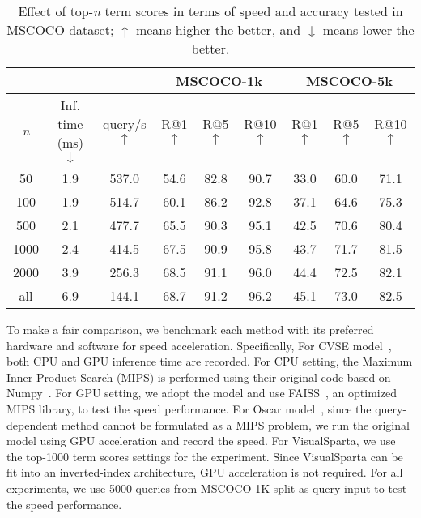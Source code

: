 \begin{table*}[ht!]
\centering
\small
\begin{tabular}{ccc@{\hskip 0.6cm}ccc@{\hskip 0.6cm}ccc}\hline
 & & & \multicolumn{3}{c}{MSCOCO-1k}&  \multicolumn{3}{c}{MSCOCO-5k} \\ \hline 

 \textit{n} & Inf. time (ms)$\downarrow$ & query/s$\uparrow$ & R@1$\uparrow$ & R@5$\uparrow$ & R@10$\uparrow$ & R@1$\uparrow$ & R@5$\uparrow$ & R@10$\uparrow$ \\ \hline  

50 & 1.9 & 537.0 & 54.6	& 82.8	& 90.7	& 33.0	& 60.0	& 71.1\\
100	& 1.9 & 514.7	& 60.1	& 86.2	& 92.8	& 37.1	& 64.6	& 75.3\\
500	& 2.1 & 477.7 & 65.5	& 90.3	& 95.1	& 42.5	& 70.6	& 80.4\\
1000 & 2.4 & 414.5 & 67.5	& 90.9	& 95.8	& 43.7	& 71.7	& 81.5\\
2000 & 3.9 & 256.3 & 68.5	& 91.1	& 96.0	& 44.4	& 72.5	& 82.1\\
all & 6.9 & 144.1 & 68.7	& 91.2	& 96.2	& 45.1	& 73.0	& 82.5\\ \hline

\end{tabular}
\caption{Effect of top-\textit{n} term scores in terms of speed and accuracy tested in MSCOCO dataset; $\uparrow$ means higher the better, and $\downarrow$ means lower the better.}
\label{tbl:visualsparta-tscore}
\end{table*}



To make a fair comparison, we benchmark each method with its preferred hardware and software for speed acceleration. Specifically, For CVSE model~\cite{wang2020consensus}, both CPU and GPU inference time are recorded. For CPU setting, the Maximum Inner Product Search (MIPS) is performed using their original code based on Numpy~\cite{harris2020array}. For GPU setting, we adopt the model and use FAISS~\cite{johnson2019billion}, an optimized MIPS library, to test the speed performance. For Oscar model~\cite{li2020oscar}, since the query-dependent method cannot be formulated as a MIPS problem, we run the original model using GPU acceleration and record the speed. For VisualSparta, we use the top-1000 term scores settings for the experiment. Since VisualSparta can be fit into an inverted-index architecture, GPU acceleration is not required. For all experiments, we use 5000 queries from MSCOCO-1K split as query input to test the speed performance.







